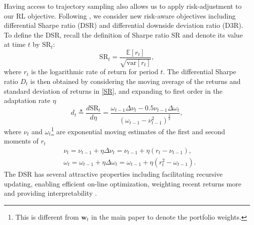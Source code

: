 \documentclass{article}
\begin{document}

Having access to trajectory sampling also allows us to apply risk-adjustment to our RL objective. Following \cite{moody2001learning}, we consider new risk-aware objectives including differential Sharpe ratio (DSR) and differential downside deviation ratio (D3R). To define the DSR, recall the definition of Sharpe ratio $\text{SR}$ and denote its value at time $t$ by $\text{SR}_t$:
\begin{equation}\label{SR}
    \text{SR}_t = \frac{\mathbb{E}[r_t]}{\sqrt{\text{var}[r_t]}},
\end{equation}
where $r_t$ is the logarithmic rate of return for period $t$. The differential Sharpe ratio $D_t$ is then obtained by considering the moving average of the returns and standard deviation of returns in \eqref{SR}, and expanding to first order in the adaptation rate $\eta$  
\begin{equation}\label{DSR}
    d_t \triangleq \frac{d\text{SR}_t}{d\eta}=\frac{\omega_{t-1}\Delta \nu_t-0.5\nu_{t-1}\Delta \omega_t}{(\omega_{t-1}-\nu^2_{t-1})^{\frac{3}{2}}},
\end{equation}
where $\nu_t$ and $\omega_t$\footnote{This is different from $\mathbf{w}_t$ in the main paper to denote the portfolio weights.} are exponential moving estimates of the first and second moments of $r_t$
\begin{equation*}
\begin{aligned}
    &\nu_t=\nu_{t-1} +\eta\Delta \nu_t=\nu_{t-1} +\eta(r_t-\nu_{t-1}),\\
    &\omega_t=\omega_{t-1} +\eta\Delta \omega_{t}=\omega_{t-1} +\eta(r^2_t-\omega_{t-1}).
\end{aligned}
\end{equation*}
The DSR has several attractive properties including facilitating recursive updating, enabling efficient on-line optimization, weighting recent returns more and providing interpretability \cite{moody2001learning}. 
\end{document}
